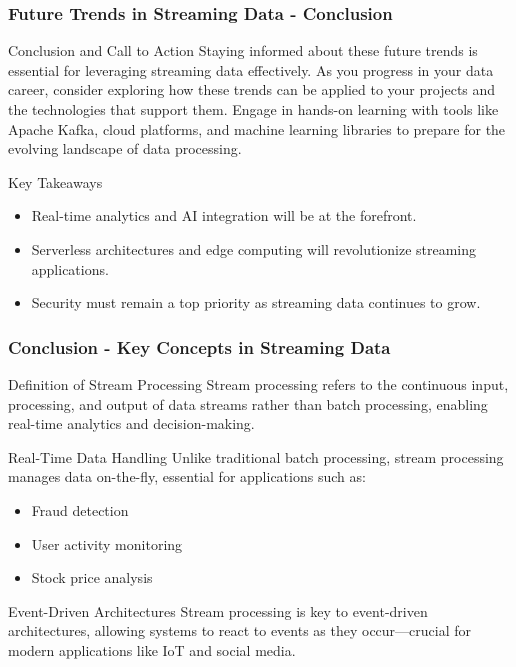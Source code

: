 \documentclass[aspectratio=169]{beamer}
\begin{document}
\begin{frame}[fragile]
    \frametitle{Future Trends in Streaming Data - Conclusion}
    \begin{block}{Conclusion and Call to Action}
        Staying informed about these future trends is essential for leveraging streaming data effectively. As you progress in your data career, consider exploring how these trends can be applied to your projects and the technologies that support them. Engage in hands-on learning with tools like Apache Kafka, cloud platforms, and machine learning libraries to prepare for the evolving landscape of data processing.
    \end{block}

    \begin{block}{Key Takeaways}
        \begin{itemize}
            \item Real-time analytics and AI integration will be at the forefront.
            \item Serverless architectures and edge computing will revolutionize streaming applications.
            \item Security must remain a top priority as streaming data continues to grow.
        \end{itemize}
    \end{block}
\end{frame}

\begin{frame}[fragile]
    \frametitle{Conclusion - Key Concepts in Streaming Data}
    
    \begin{block}{Definition of Stream Processing}
        Stream processing refers to the continuous input, processing, and output of data streams rather than batch processing, enabling real-time analytics and decision-making.
    \end{block}

    \begin{block}{Real-Time Data Handling}
        Unlike traditional batch processing, stream processing manages data on-the-fly, essential for applications such as:
        \begin{itemize}
            \item Fraud detection
            \item User activity monitoring
            \item Stock price analysis
        \end{itemize}
    \end{block}

    \begin{block}{Event-Driven Architectures}
        Stream processing is key to event-driven architectures, allowing systems to react to events as they occur—crucial for modern applications like IoT and social media.
    \end{block}
\end{frame}
\end{document}
